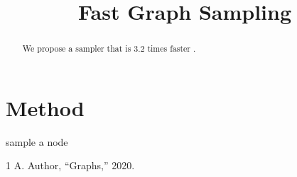 \documentclass[conference]{IEEEtran}
\begin{document}
\title{Fast Graph Sampling}
\author{}
\maketitle

\begin{abstract}
We propose a sampler that is 3.2 times faster \citep{ref1}.
\end{abstract}

\section{Method}
\begin{algorithm}
\caption{Sampler}
\begin{algorithmic}
\STATE sample a node
\end{algorithmic}
\end{algorithm}

\begin{thebibliography}{1}
 A. Author, ``Graphs,'' 2020.
\end{thebibliography}
\end{document}
